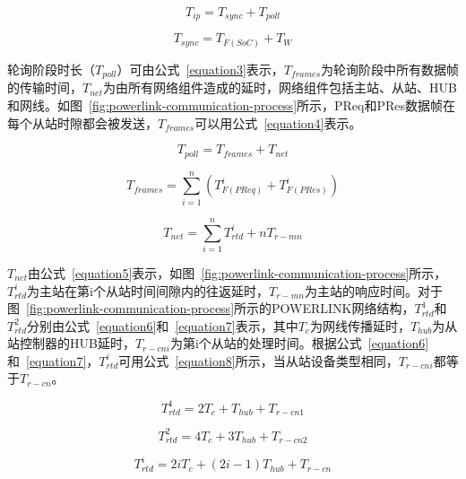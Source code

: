 \begin{equation}
\label{equation1}
T_{ip}=T_{sync}+T_{poll}
\end{equation}

\begin{equation}
\label{equation2}
T_{sync}=T_{F(SoC)}+T_{W}
\end{equation}

轮询阶段时长（$T_{poll}$）可由公式~\ref{equation3}表示，$T_{frames}$为轮询阶段中所有数据帧的传输时间，$T_{net}$为由所有网络组件造成的延时，网络组件包括主站、从站、HUB和网线。如图~\ref{fig:powerlink-communication-process}所示，PReq和PRes数据帧在每个从站时隙都会被发送，$T_{frames}$可以用公式~\ref{equation4}表示。

\begin{equation}
\label{equation3}
T_{poll}=T_{frames}+T_{net}
\end{equation}

\begin{equation}
\label{equation4}
T_{frames}=\sum_{i=1}^n(T_{F(PReq)}^{i}+T_{F(PRes)}^{i})
\end{equation}

\begin{equation}
\label{equation5}
T_{net}=\sum_{i=1}^nT_{rtd}^{i}+nT_{r-mn}
\end{equation}

$T_{net}$由公式~\ref{equation5}表示，如图~\ref{fig:powerlink-communication-process}所示，$T_{rtd}^{i}$为主站在第i个从站时间间隙内的往返延时，$T_{r-mn}$为主站的响应时间。对于图~\ref{fig:powerlink-communication-process}所示的POWERLINK网络结构，$T_{rtd}^{1}$和$T_{rtd}^{2}$分别由公式~\ref{equation6}和~\ref{equation7}表示，其中$T_{c}$为网线传播延时，$T_{hub}$为从站控制器的HUB延时，$T_{r-cni}$为第i个从站的处理时间。根据公式~\ref{equation6}和~\ref{equation7}，$T_{rtd}^{i}$可用公式~\ref{equation8}所示，当从站设备类型相同，$T_{r-cni}$都等于$T_{r-cn}$。

\begin{equation}
\label{equation6}
T_{rtd}^{1}=2T_{c}+T_{hub}+T_{r-cn1}
\end{equation}

\begin{equation}
\label{equation7}
T_{rtd}^{2}=4T_{c}+3T_{hub}+T_{r-cn2}
\end{equation}

\begin{equation}
\label{equation8}
T_{rtd}^{i}=2iT_{c}+(2i-1)T_{hub}+T_{r-cn}
\end{equation}

